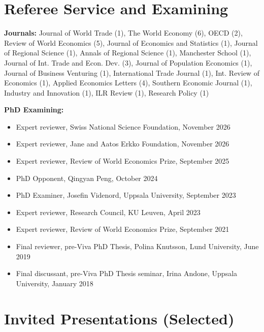 \documentclass[11pt,a4paper]{article}
\newcommand{\cventry}[1]{\item #1}
\begin{document}
\section{Referee Service and Examining}

\textbf{Journals:} Journal of World Trade (1), The World Economy (6), OECD (2), Review of World Economics (5), Journal of Economics and Statistics (1), Journal of Regional Science (1), Annals of Regional Science (1), Manchester School (1), Journal of Int. Trade and Econ. Dev. (3), Journal of Population Economics (1), Journal of Business Venturing (1), International Trade Journal (1), Int. Review of Economics (1), Applied Economics Letters (4), Southern Economic Journal (1), Industry and Innovation (1), ILR Review (1), Research Policy (1)

\vspace{6pt}
\textbf{PhD Examining:}
\begin{itemize}
 \cventry{Expert reviewer, Swiss National Science Foundation, November 2026} %
 \cventry{Expert reviewer, Jane and Aatos Erkko Foundation, November 2026} %
 \cventry{Expert reviewer, Review of World Economics Prize, September 2025}
 \cventry{PhD Opponent, Qingyan Peng, October 2024}
 \cventry{PhD Examiner, Josefin Videnord, Uppsala University, September 2023}
 \cventry{Expert reviewer, Research Council, KU Leuven, April 2023}
 \cventry{Expert reviewer, Review of World Economics Prize, September 2021}
 \cventry{Final reviewer, pre-Viva PhD Thesis, Polina Knutsson, Lund University, June 2019}
 \cventry{Final discussant, pre-Viva PhD Thesis seminar, Irina Andone, Uppsala University, January 2018}
\end{itemize}

\section{Invited Presentations (Selected)}
\end{document}
